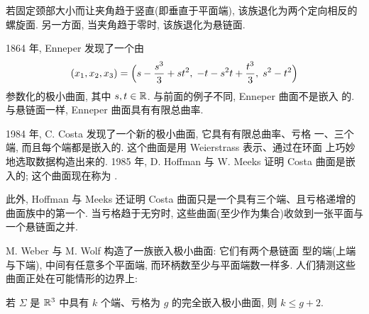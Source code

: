 
若固定颈部大小而让夹角趋于竖直(即垂直于平面端), 该族退化为两个定向相反的
螺旋面. 另一方面, 当夹角趋于零时, 该族退化为悬链面.


1864 年, Enneper \cite{E} 发现了一个由
\begin{equation}
(x_1,x_2,x_3)=\Bigl(s-\frac{s^3}{3}+st^2,\;-t-s^2t+\frac{t^3}{3},\;s^2-t^2\Bigr)
\label{eq:1.49}
\end{equation}
参数化的极小曲面, 其中 $s,t\in\mathbb{R}$. 与前面的例子不同, Enneper 曲面不是嵌入
的. 与悬链面一样, Enneper 曲面具有有限总曲率.


1984 年, C. Costa \cite{Cc} 发现了一个新的极小曲面, 它具有有限总曲率、亏格
一、三个端, 而且每个端都是嵌入的. 这个曲面是用 Weierstrass 表示、通过在环面
上巧妙地选取数据构造出来的. 1985 年, D. Hoffman 与 W. Meeks \cite{HoMe1}
证明 Costa 曲面是嵌入的; 这个曲面现在称为
.

此外, Hoffman 与 Meeks 还证明 Costa 曲面只是一个具有三个端、且亏格递增的
曲面族中的第一个. 当亏格趋于无穷时, 这些曲面(至少作为集合)收敛到一张平面与
一个悬链面之并.




M. Weber 与 M. Wolf \cite{WeWo2} 构造了一族嵌入极小曲面: 它们有两个悬链面
型的端(上端与下端), 中间有任意多个平面端, 而环柄数至少与平面端数一样多.
人们猜测这些曲面正处在可能情形的边界上:

\begin{conjecture}
\label{conj:1.6}
若 $\Sigma$ 是 $\mathbb{R}^3$ 中具有 $k$ 个端、亏格为 $g$ 的完全嵌入极小曲面, 则
$k\leq g+2$.
\end{conjecture}


